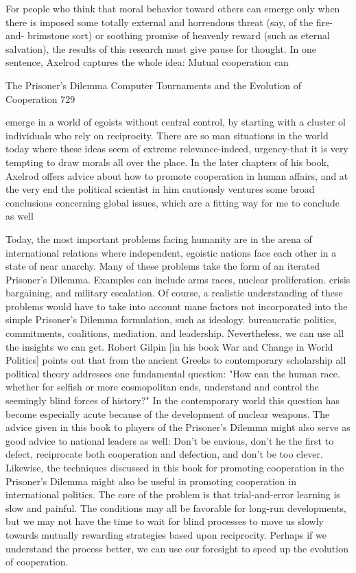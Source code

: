         For people who think that moral behavior toward others can emerge only when
there is imposed some totally external and horrendous threat (say, of the fire-and-
brimstone sort) or soothing promise of heavenly reward (such as eternal salvation), the
results of this research must give pause for thought. In one sentence, Axelrod captures the
whole idea: Mutual cooperation can




The Prisoner's Dilemma Computer Tournaments and the Evolution of Cooperation           729

emerge in a world of egoists without central control, by starting with a cluster ol
individuals who rely on reciprocity.
        There are so man situations in the world today where these ideas seem of extreme
relevance-indeed, urgency-that it is very tempting to draw morals all over the place. In
the later chapters of his book, Axelrod offers advice about how to promote cooperation in
human affairs, and at the very end the political scientist in him cautiously ventures some
broad conclusions concerning global issues, which are a fitting way for me to conclude as
well

         Today, the most important problems facing humanity are in the arena of
 international relations where independent, egoistic nations face each other in a state of
 near anarchy. Many of these problems take the form of an iterated Prisoner's
 Dilemma. Examples can include arms races, nuclear proliferation. crisis bargaining,
 and military escalation. Of course, a realistic understanding of these problems would
 have to take into account mane factors not incorporated into the simple Prisoner's
 Dilemma formulation, such as ideology. bureaucratic politics, commitments,
 coalitions, mediation, and leadership. Nevertheless, we can use all the insights we can
 get.
         Robert Gilpin [in his book War and Change in World Politics] points out that
 from the ancient Greeks to contemporary scholarship all political theory addresses
 one fundamental question: "How can the human race. whether for selfish or more
 cosmopolitan ends, understand and control the seemingly blind forces of history?" In
 the contemporary world this question has become especially acute because of the
 development of nuclear weapons.
         The advice given in this book to players of the Prisoner's Dilemma might also
 serve as good advice to national leaders as well: Don't be envious, don't he the first to
 defect, reciprocate both cooperation and defection, and don't be too clever. Likewise,
 the techniques discussed in this book for promoting cooperation in the Prisoner's
 Dilemma might also be useful in promoting cooperation in international politics.
         The core of the problem is that trial-and-error learning is slow and painful.
 The conditions may all be favorable for long-run developments, but we may not have
 the time to wait for blind processes to move us slowly towards mutually rewarding
 strategies based upon reciprocity. Perhaps if we understand the process better, we can
 use our foresight to speed up the evolution of cooperation.

